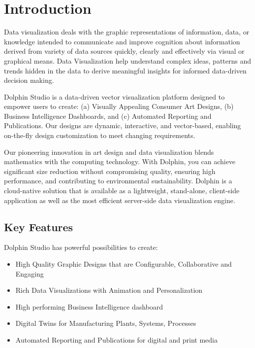 \documentclass{amm-pst-report}
\title{\huge{\color{teal}{Dolphin: A Dynamic Vector Visualization Studio}}}
\author{Product Brochure\\\small{Version \version}}
\date{\vspace{-10mm}}
\begin{document}
\maketitles






\section{Introduction}
Data visualization deals with the graphic representations of information, data, or knowledge intended to communicate and improve cognition about information derived from variety of data sources quickly, clearly and effectively via visual or graphical means. Data Visualization help understand complex ideas, patterns and trends hidden in the data to derive meaningful insights for informed data-driven decision making.

Dolphin Studio is a data-driven vector visualization platform designed to empower users to create: (a) Visually Appealing Consumer Art Designs, (b) Business Intelligence Dashboards, and (c) Automated Reporting and Publications. Our designs are dynamic, interactive, and vector-based, enabling on-the-fly design customization to meet changing requirements.

Our pioneering innovation in art design and data visualization blends mathematics with the computing technology. With Dolphin, you can achieve significant size reduction without compromising quality, ensuring high performance, and contributing to environmental sustainability. Dolphin is a cloud-native solution that is available as a lightweight, stand-alone, client-side application as well as the most efficient server-side data visualization engine.

\subsection{Key Features}
Dolphin Studio has powerful possibilities to create:
\begin{itemize}[nosep]
\item High Quality Graphic Designs that are Configurable, Collaborative and Engaging
\item Rich Data Visualizations with Animation and Personalization
\item High performing Business Intelligence dashboard
\item Digital Twins for Manufacturing Plants, Systems, Processes
\item Automated Reporting and Publications for digital and print media
\end{itemize}
\end{document}
